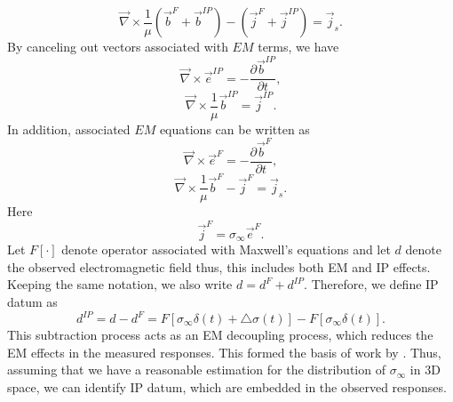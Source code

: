 \documentclass[a4paper, 11pt]{article}
\newcommand{\curl}{{\vec \nabla}\times}
\newcommand{\siginf}{\sigma_\infty}
\newcommand{\dsig}{\triangle\sigma}
\renewcommand {\j}  { {\vec j} }
\renewcommand {\b}  { {\vec b} }
\newcommand {\e}  { {\vec e} }
\newcommand{\dip}{d^{IP}}
\begin{document}
\begin{equation}
  \curl\frac{1}{\mu}(\b^{F}+\b^{IP}) - (\j^{F}+\j^{IP})= \j_{s}.
\end{equation}
By canceling out vectors associated with $EM$ terms, we have
\begin{equation}
  \curl \e^{IP} = -\frac{\partial \b^{IP}}{\partial t},
  \label{eq: eq_secondary_farad}
\end{equation}
\begin{equation}
  \curl{\frac{1}{\mu}\b^{IP}} = \j^{IP}.
  \label{eq: eq_secondary_coulomb}
\end{equation}
In addition, associated $EM$ equations can be written as
\begin{equation}
  \curl \e^{F} = -\frac{\partial \b^{F}}{\partial t},
  \label{eq: eq_primary_farad}
\end{equation}
\begin{equation}
  \curl{\frac{1}{\mu}\b^{F}} -\j^{F} = \j_s.
  \label{eq: eq_primary_coulomb}
\end{equation}
Here
\begin{equation}
  \j^{F} = \siginf\e^{F}.
  \label{eq: jF}
\end{equation}
Let $F[\cdot]$ denote operator associated with Maxwell’s equations and let $d$ denote the observed electromagnetic field thus, this includes both EM and IP effects. Keeping the same notation, we also write $d = d^{F} + \dip$. Therefore, we define IP datum as
\begin{equation}
  \dip = d - d^{F} = F[\siginf\delta(t)+\dsig(t)]-F[\siginf\delta(t)].
    \label{eq: IPdatum_syn}
\end{equation}
This subtraction process acts as an EM decoupling process, which reduces the EM effects in the measured responses. 
This formed the basis of work by \cite{routh2001}. 
Thus, assuming that we have a reasonable estimation for the distribution of $\siginf$ in 3D space, we can identify  IP datum, which are embedded in the observed responses. 

\end{document}
